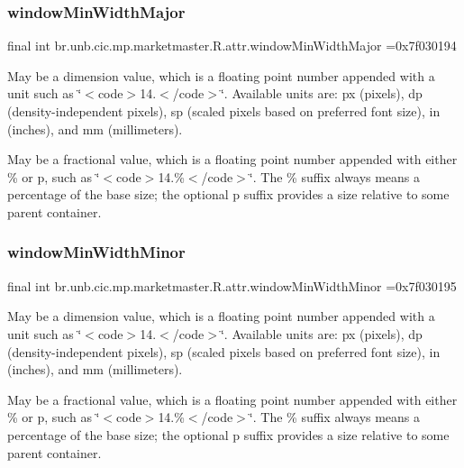 \subsubsection{\texorpdfstring{window\+Min\+Width\+Major}{windowMinWidthMajor}}
{\footnotesize\ttfamily final int br.\+unb.\+cic.\+mp.\+marketmaster.\+R.\+attr.\+window\+Min\+Width\+Major =0x7f030194\hspace{0.3cm}{\ttfamily [static]}}

May be a dimension value, which is a floating point number appended with a unit such as \char`\"{}$<$code$>$14.\+5sp$<$/code$>$\char`\"{}. Available units are\+: px (pixels), dp (density-\/independent pixels), sp (scaled pixels based on preferred font size), in (inches), and mm (millimeters). 

May be a fractional value, which is a floating point number appended with either \% or p, such as \char`\"{}$<$code$>$14.\%$<$/code$>$\char`\"{}. The \% suffix always means a percentage of the base size; the optional p suffix provides a size relative to some parent container. \mbox{\label{classbr_1_1unb_1_1cic_1_1mp_1_1marketmaster_1_1R_1_1attr_a9b75a5f8d3c75a8240b49984a51c5eff}} 
\subsubsection{\texorpdfstring{window\+Min\+Width\+Minor}{windowMinWidthMinor}}
{\footnotesize\ttfamily final int br.\+unb.\+cic.\+mp.\+marketmaster.\+R.\+attr.\+window\+Min\+Width\+Minor =0x7f030195\hspace{0.3cm}{\ttfamily [static]}}

May be a dimension value, which is a floating point number appended with a unit such as \char`\"{}$<$code$>$14.\+5sp$<$/code$>$\char`\"{}. Available units are\+: px (pixels), dp (density-\/independent pixels), sp (scaled pixels based on preferred font size), in (inches), and mm (millimeters). 

May be a fractional value, which is a floating point number appended with either \% or p, such as \char`\"{}$<$code$>$14.\%$<$/code$>$\char`\"{}. The \% suffix always means a percentage of the base size; the optional p suffix provides a size relative to some parent container. \mbox{\label{classbr_1_1unb_1_1cic_1_1mp_1_1marketmaster_1_1R_1_1attr_a2f0b822528d2323664e66c4091b94d92}} 
